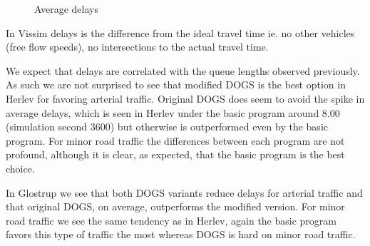 \begin{figure}[htbp]
\caption{Average delays}
\label{fig:delays}
\end{figure}

In Vissim delays is the difference from the ideal travel time ie. no other vehicles (free flow speeds), no intersections to the actual travel time. 

We expect that delays are correlated with the queue lengths observed previously. As such we are not surprised to see that modified DOGS is the best option in Herlev for favoring arterial traffic. Original DOGS does seem to avoid the spike in average delays, which is seen in Herlev under the basic program around 8.00 (simulation second 3600) but otherwise is outperformed even by the basic program. 
For minor road traffic the differences between each program are not profound, although it is clear, as expected, that the basic program is the best choice.

In Glostrup we see that both DOGS variants reduce delays for arterial traffic and that original DOGS, on average, outperforms the modified version. For minor road traffic we see the same tendency as in Herlev, again the basic program favors this type of traffic the most whereas DOGS is hard on minor road traffic.

